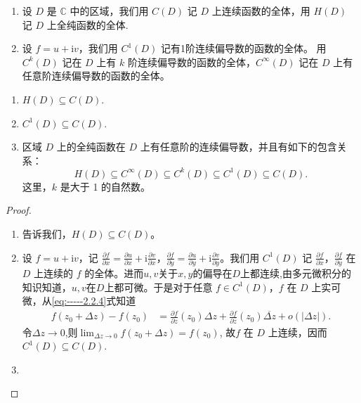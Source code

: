 \documentclass[../../main.tex]{subfiles}%
\begin{document}
\begin{definition}
\begin{enumerate}
\item 设 \( D \) 是 \( \mathbb{C} \) 中的区域，我们用 \( C(D) \) 记 \( D \) 上连续函数的全体，用 \( H(D) \) 记 \( D \) 上全纯函数的全体.

\item 设 \( f = u + \mathrm{i}v \)，我们用 \( C^1(D) \) 记有1阶连续偏导数的函数的全体。
用 \( C^k(D) \) 记在 \( D \) 上有 \( k \) 阶连续偏导数的函数的全体，\( C^\infty(D) \) 记在 \( D \) 上有任意阶连续偏导数的函数的全体。
\end{enumerate}
\end{definition}

\begin{proposition}\label{proposition:全纯函数必任意连续可微}
\begin{enumerate}[(1)]
\item \( H(D) \subseteq C(D) \).

\item $C^1(D) \subseteq C(D).$

\item 区域 \( D \) 上的全纯函数在 \( D \) 上有任意阶的连续偏导数，并且有如下的包含关系：
\[
H(D) \subseteq C^\infty(D) \subseteq C^k(D) \subseteq C^1(D) \subseteq C(D).
\]
这里，\( k \) 是大于 1 的自然数。
\end{enumerate}
\end{proposition}
\begin{proof}
\begin{enumerate}[(1)]
\item {}告诉我们，\( H(D) \subseteq C(D) \)。

\item 设 \( f = u + \mathrm{i}v \)，记 \( \frac{\partial f}{\partial x} = \frac{\partial u}{\partial x} + \mathrm{i}\frac{\partial v}{\partial x} \)，\( \frac{\partial f}{\partial y} = \frac{\partial u}{\partial y} + \mathrm{i}\frac{\partial v}{\partial y} \)。我们用 \( C^1(D) \) 记 \( \frac{\partial f}{\partial x} \)，\( \frac{\partial f}{\partial y} \) 在 \( D \) 上连续的 \( f \) 的全体。进而$u,v$关于$x,y$的偏导在$D$上都连续,由多元微积分的知识知道，$u,v$在$D$上都可微。于是对于任意 \( f \in C^1(D) \)，\( f \) 在 \( D \) 上实可微，从\eqref{eq:-----2.2.4}式知道
\begin{align*}
f(z_0 + \Delta z) - f(z_0) &= \frac{\partial f}{\partial z}(z_0)\Delta z + \frac{\partial f}{\partial \overline{z}}(z_0)\overline{\Delta z} + o(|\Delta z|).
\end{align*}
令$\Delta z\to 0$,则$\lim_{\Delta z\to 0}f(z_0+\Delta z)=f(z_0)$,
故\( f \) 在 \( D \) 上连续，因而
$C^1(D) \subseteq C(D).$

\item 
\end{enumerate}

\end{proof}
\end{document}
